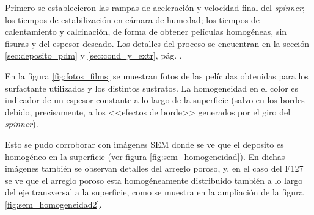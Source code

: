 		Primero se establecieron las rampas de aceleración y velocidad final del \textit{spinner}; los tiempos de estabilización en cámara de humedad; los tiempos de calentamiento y calcinación, de forma de obtener películas homogéneas, sin fisuras y del espesor deseado. Los detalles del proceso se encuentran en la sección \ref{sec:deposito_pdm} y \ref{sec:cond_y_extr}, pág. \pageref{sec:deposito_pdm}. 

		En la figura \ref{fig:fotos_films} se muestran fotos de las películas obtenidas para los surfactante utilizados y los distintos sustratos. La homogeneidad en el color es indicador de un espesor constante a lo largo de la superficie (salvo en los bordes debido, precisamente, a los <<efectos de borde>> generados por el giro del \textit{spinner})\cite{Franssila2004,Jaeger2001}. 

		Esto se pudo corroborar con imágenes SEM donde se ve que el deposito es homogéneo en la superficie  (ver figura \ref{fig:sem_homogeneidad}). En dichas imágenes también se observan detalles del arreglo poroso, y, en el caso del F127 se ve que el arreglo poroso esta homogéneamente distribuido también a lo largo del eje transversal a la superficie, como se muestra en la ampliación de la figura \ref{fig:sem_homogeneidad2}.
